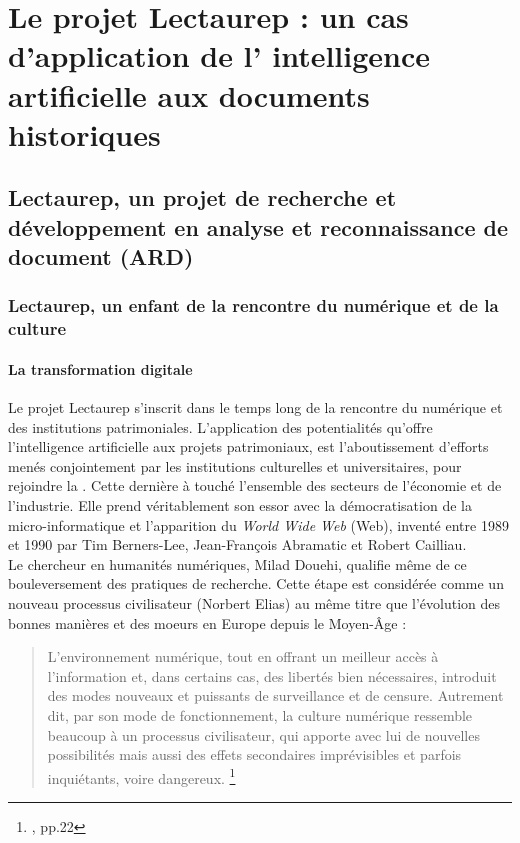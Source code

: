 \part{Le projet Lectaurep : un cas d'application de l' \og intelligence artificielle\fg{}  aux documents historiques}\label{partie_1}

\chapter{Lectaurep, un projet de recherche et développement en analyse et reconnaissance de document (ARD)}

\section{Lectaurep, un enfant de la rencontre du numérique et de la culture}

\subsection{La transformation digitale}

Le projet Lectaurep s'inscrit dans le temps long de la rencontre du numérique et des institutions patrimoniales. L'application des potentialités qu'offre l'intelligence artificielle aux projets patrimoniaux, est l'aboutissement d'efforts menés conjointement par les institutions culturelles et universitaires, pour rejoindre la . Cette dernière à touché l'ensemble des secteurs de l'économie et de l'industrie. Elle prend véritablement son essor avec la démocratisation de la micro-informatique et l'apparition du \textit{World Wide Web} (Web), inventé entre 1989 et 1990 par Tim Berners-Lee, Jean-François Abramatic et Robert Cailliau.\\

Le chercheur en humanités numériques, Milad Douehi, qualifie même de  ce bouleversement des pratiques de recherche. Cette étape est considérée comme un nouveau processus civilisateur (Norbert Elias) au même titre que l'évolution des bonnes manières et des moeurs en Europe depuis le Moyen-Âge : 

\begin{quote}
    L'environnement numérique, tout en offrant un meilleur accès à l'information et, dans certains cas, des libertés bien nécessaires, introduit des modes nouveaux et puissants de surveillance et de censure. Autrement dit, par son mode de fonctionnement, la culture numérique ressemble beaucoup à un processus civilisateur, qui apporte avec lui de nouvelles possibilités mais aussi des effets secondaires imprévisibles et parfois inquiétants, voire dangereux. \footnote{\cite{doueihi_grande_2011}, pp.22}
\end{quote}

